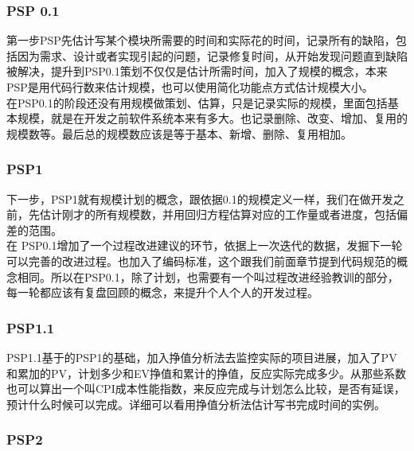 \hypertarget{psp-0.1}{%
\subsubsection{PSP 0.1}\label{psp-0.1}}

第一步PSP先估计写某个模块所需要的时间和实际花的时间，记录所有的缺陷，包括因为需求、设计或者实现引起的问题，记录修复时间，从开始发现问题直到缺陷被解决，提升到PSP0.1策划不仅仅是估计所需时间，加入了规模的概念，本来PSP是用代码行数来估计规模，也可以使用简化功能点方式估计规模大小。\\
在PSP0.1的阶段还没有用规模做策划、估算，只是记录实际的规模，里面包括基本规模，就是在开发之前软件系统本来有多大。也记录删除、改变、增加、复用的规模数等。最后总的规模数应该是等于基本、新增、删除、复用相加。

\hypertarget{psp1}{%
\subsubsection{PSP1}\label{psp1}}

下一步，PSP1就有规模计划的概念，跟依据0.1的规模定义一样，我们在做开发之前，先估计刚才的所有规模数，并用回归方程估算对应的工作量或者进度，包括偏差的范围。\\
在
PSP0.1增加了一个过程改进建议的环节，依据上一次迭代的数据，发掘下一轮可以完善的改进过程。也加入了编码标准，这个跟我们前面章节提到代码规范的概念相同。所以在PSP0.1，除了计划，也需要有一个叫过程改进经验教训的部分，每一轮都应该有复盘回顾的概念，来提升个人个人的开发过程。

\hypertarget{psp1.1}{%
\subsubsection{PSP1.1}\label{psp1.1}}

PSP1.1基于的PSP1的基础，加入挣值分析法去监控实际的项目进展，加入了PV和累加的PV，计划多少和EV挣值和累计的挣值，反应实际完成多少。从那些系数也可以算出一个叫CPI成本性能指数，来反应完成与计划怎么比较，是否有延误，预计什么时候可以完成。详细可以看用挣值分析法估计写书完成时间的实例。

\hypertarget{psp2}{%
\subsubsection{PSP2}\label{psp2}}

